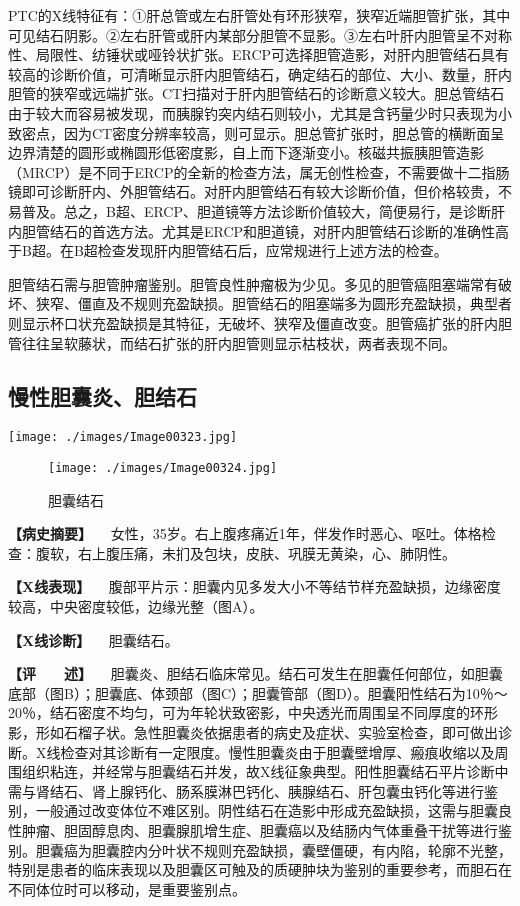 PTC的X线特征有：①肝总管或左右肝管处有环形狭窄，狭窄近端胆管扩张，其中可见结石阴影。②左右肝管或肝内某部分胆管不显影。③左右叶肝内胆管呈不对称性、局限性、纺锤状或哑铃状扩张。ERCP可选择胆管造影，对肝内胆管结石具有较高的诊断价值，可清晰显示肝内胆管结石，确定结石的部位、大小、数量，肝内胆管的狭窄或远端扩张。CT扫描对于肝内胆管结石的诊断意义较大。胆总管结石由于较大而容易被发现，而胰腺钓突内结石则较小，尤其是含钙量少时只表现为小致密点，因为CT密度分辨率较高，则可显示。胆总管扩张时，胆总管的横断面呈边界清楚的圆形或椭圆形低密度影，自上而下逐渐变小。核磁共振胰胆管造影（MRCP）是不同于ERCP的全新的检查方法，属无创性检查，不需要做十二指肠镜即可诊断肝内、外胆管结石。对肝内胆管结石有较大诊断价值，但价格较贵，不易普及。总之，B超、ERCP、胆道镜等方法诊断价值较大，简便易行，是诊断肝内胆管结石的首选方法。尤其是ERCP和胆道镜，对肝内胆管结石诊断的准确性高于B超。在B超检查发现肝内胆管结石后，应常规进行上述方法的检查。

胆管结石需与胆管肿瘤鉴别。胆管良性肿瘤极为少见。多见的胆管癌阻塞端常有破坏、狭窄、僵直及不规则充盈缺损。胆管结石的阻塞端多为圆形充盈缺损，典型者则显示杯口状充盈缺损是其特征，无破坏、狭窄及僵直改变。胆管癌扩张的肝内胆管往往呈软藤状，而结石扩张的肝内胆管则显示枯枝状，两者表现不同。

\subsection{慢性胆囊炎、胆结石}

\texttt{[image: ./images/Image00323.jpg]}

\begin{figure}[!htbp]
 \centering
 \texttt{[image: ./images/Image00324.jpg]}
 \captionsetup{justification=centering}
 \caption{胆囊结石}
 \label{fig5-8-5}
  \end{figure} 

\textbf{【病史摘要】}
　女性，35岁。右上腹疼痛近1年，伴发作时恶心、呕吐。体格检查：腹软，右上腹压痛，未扪及包块，皮肤、巩膜无黄染，心、肺阴性。

\textbf{【X线表现】}
　腹部平片示：胆囊内见多发大小不等结节样充盈缺损，边缘密度较高，中央密度较低，边缘光整（图A）。

\textbf{【X线诊断】} 　胆囊结石。

\textbf{【评　　述】}
　胆囊炎、胆结石临床常见。结石可发生在胆囊任何部位，如胆囊底部（图B）；胆囊底、体颈部（图C）；胆囊管部（图D）。胆囊阳性结石为10％～20％，结石密度不均匀，可为年轮状致密影，中央透光而周围呈不同厚度的环形影，形如石榴子状。急性胆囊炎依据患者的病史及症状、实验室检查，即可做出诊断。X线检查对其诊断有一定限度。慢性胆囊炎由于胆囊壁增厚、瘢痕收缩以及周围组织粘连，并经常与胆囊结石并发，故X线征象典型。阳性胆囊结石平片诊断中需与肾结石、肾上腺钙化、肠系膜淋巴钙化、胰腺结石、肝包囊虫钙化等进行鉴别，一般通过改变体位不难区别。阴性结石在造影中形成充盈缺损，这需与胆囊良性肿瘤、胆固醇息肉、胆囊腺肌增生症、胆囊癌以及结肠内气体重叠干扰等进行鉴别。胆囊癌为胆囊腔内分叶状不规则充盈缺损，囊壁僵硬，有内陷，轮廓不光整，特别是患者的临床表现以及胆囊区可触及的质硬肿块为鉴别的重要参考，而胆石在不同体位时可以移动，是重要鉴别点。

